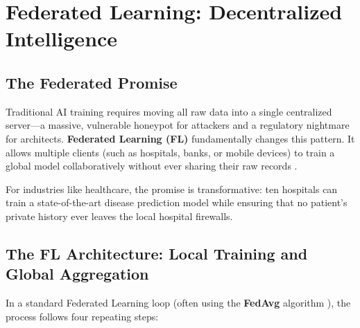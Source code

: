 
\chapter{Federated Learning: Decentralized Intelligence}
\label{chap:federated_learning}


\section{The Federated Promise}
\label{sec:federated_promise}

Traditional AI training requires moving all raw data into a single centralized server---a massive, vulnerable honeypot for attackers and a regulatory nightmare for architects. \textbf{Federated Learning (FL)} \cite{mcmahan2017} fundamentally changes this pattern. It allows multiple clients (such as hospitals, banks, or mobile devices) to train a global model collaboratively without ever sharing their raw records \cite{science-journal}.

For industries like healthcare, the promise is transformative: ten hospitals can train a state-of-the-art disease prediction model while ensuring that no patient's private history ever leaves the local hospital firewalls.

\section{The FL Architecture: Local Training and Global Aggregation}
\label{sec:fl_architecture}

In a standard Federated Learning loop (often using the \textbf{FedAvg} algorithm \cite{mcmahan2017}), the process follows four repeating steps:

